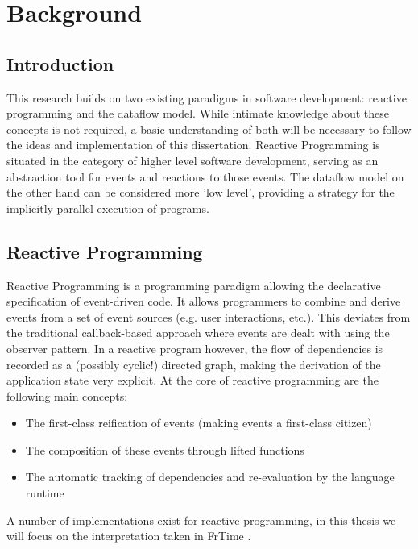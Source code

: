 \chapter{Background}

\section{Introduction}

This research builds on two existing paradigms in software development: reactive programming and the dataflow model. While intimate knowledge about these concepts is not required, a basic understanding of both will be necessary to follow the ideas and implementation of this dissertation. Reactive Programming is situated in the category of higher level software development, serving as an abstraction tool for events and reactions to those events. The dataflow model on the other hand can be considered more 'low level', providing a strategy for the implicitly parallel execution of programs. 

\newpage

\section{Reactive Programming}

Reactive Programming is a programming paradigm allowing the declarative specification of event-driven code. It allows programmers to combine and derive events from a set of event sources (e.g. user interactions, etc.). This deviates from the traditional callback-based approach where events are dealt with using the observer pattern. In a reactive program however, the flow of dependencies is recorded as a (possibly cyclic!) directed graph, making the derivation of the application state very explicit.
At the core of reactive programming are the following main concepts:
\begin{itemize}
	\item The first-class reification of events (making events a first-class citizen)
	\item The composition of these events through lifted functions
	\item The automatic tracking of dependencies and re-evaluation by the language runtime
\end{itemize}

A number of implementations exist for reactive programming, in this thesis we will focus on the interpretation taken in FrTime \citep{cooper_embedding_2006}.


